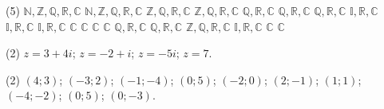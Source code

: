 \documentclass[11pt,a4paper]{scrartcl}
\begin{document}
\begin{problem} \phantom{text}
\begin{tasks}[label={(\arabic*)}, label-offset=0.9em](5)
    \task $\mathbb{N},\mathbb{Z},\mathbb{Q},\mathbb{R},\mathbb{C}$
    \task $\mathbb{N},\mathbb{Z},\mathbb{Q},\mathbb{R},\mathbb{C}$
    \task $\mathbb{Z},\mathbb{Q},\mathbb{R},\mathbb{C}$
    \task $\mathbb{Z},\mathbb{Q},\mathbb{R},\mathbb{C}$
    \task $\mathbb{Q},\mathbb{R},\mathbb{C}$
    \task $\mathbb{Q},\mathbb{R},\mathbb{C}$
    \task $\mathbb{Q},\mathbb{R},\mathbb{C}$
    \task $\mathbb{I},\mathbb{R},\mathbb{C}$
    \task $\mathbb{I},\mathbb{R},\mathbb{C}$
    \task $\mathbb{I},\mathbb{R},\mathbb{C}$
    \task $\mathbb{C}$
    \task $\mathbb{C}$
    \task $\mathbb{C}$
    \task $\mathbb{C}$
    \task $\mathbb{Q},\mathbb{R},\mathbb{C}$
    \task $\mathbb{Q},\mathbb{R},\mathbb{C}$
    \task $\mathbb{Z},\mathbb{Q},\mathbb{R},\mathbb{C}$
    \task $\mathbb{I},\mathbb{R},\mathbb{C}$
    \task $\mathbb{C}$
    \task $\mathbb{C}$
\end{tasks}
\end{problem}

\setcounter{problem}{2}
\begin{problem} \phantom{text}
\begin{tasks}[label={(\arabic*)}, label-offset=0.9em](2)
    \task $z = 3 + 4i$;
    \task $z = -2 + i$;
    \task $z = -5i$;
    \task $z = 7$.
\end{tasks}
\end{problem}

\setcounter{problem}{3}
\begin{problem} \phantom{text}
\begin{tasks}[label={(\arabic*)}, label-offset=0.9em](2)
    \task $(4; 3)$;
    \task $(-3; 2)$;
    \task $(-1; -4)$;
    \task $(0; 5)$;
    \task $(-2; 0)$;
    \task $(2; -1)$;
    \task $(1; 1)$;
    \task $(-4; -2)$;
    \task $(0; 5)$;
    \task $(0; -3)$.
\end{tasks}
\end{problem} 
\end{document}
